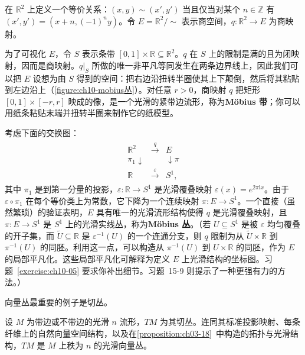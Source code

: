 \documentclass[../../main.tex]{subfiles}
\begin{document}
\begin{example}[Möbius 丛]\label{example:ch10-mobius丛}
在 $\mathbb{R}^2$ 上定义一个等价关系：$(x,y)\sim(x',y')$ 当且仅当对某个 $n\in\mathbb{Z}$ 有 $(x',y')=(x+n,(-1)^n y)$。令 $E=\mathbb{R}^2/\sim$ 表示商空间，$q\colon\mathbb{R}^2\to E$ 为商映射。

为了可视化 $E$，令 $S$ 表示条带 $[0,1]\times\mathbb{R}\subseteq\mathbb{R}^2$。$q$ 在 $S$ 上的限制是满的且为闭映射，因而是商映射。$q|_S$ 所做的唯一非平凡等同发生在两条边界线上，因此我们可以把 $E$ 设想为由 $S$ 得到的空间：把右边沿扭转半圈使其上下颠倒，然后将其粘贴到左边沿上（\cref{figure:ch10-mobius丛}）。对任意 $r>0$，商映射 $q$ 把矩形 $[0,1]\times[-r,r]$ 映成的像，是一个光滑的紧带边流形，称为\textbf{Möbius 带}；你可以用纸条粘贴末端并扭转半圈来制作它的纸模型。

考虑下面的交换图：
\begin{align*}
\begin{array}{ccc}
\mathbb{R}^2 & \xrightarrow{q} & E\\
\pi_1\downarrow && \downarrow\pi\\
\mathbb{R} & \xrightarrow{\varepsilon} & S^1,
\end{array}
\end{align*}
其中 $\pi_1$ 是到第一分量的投影，$\varepsilon\colon\mathbb{R}\to S^1$ 是光滑覆叠映射 $\varepsilon(x)=e^{2\pi\mathrm{i}x}$。由于 $\varepsilon\circ\pi_1$ 在每个等价类上为常数，它下降为一个连续映射 $\pi\colon E\to S^1$。一个直接（虽然繁琐）的验证表明，$E$ 具有唯一的光滑流形结构使得 $q$ 是光滑覆叠映射，且 $\pi\colon E\to S^1$ 是 $S^1$ 上的光滑实线丛，称为\textbf{Möbius 丛}。（若 $U\subseteq S^1$ 是被 $\varepsilon$ 均匀覆叠的开子集，而 $\widetilde U\subseteq\mathbb{R}$ 是 $\varepsilon^{-1}(U)$ 的一个连通分支，则 $q$ 限制为从 $\widetilde U\times\mathbb{R}$ 到 $\pi^{-1}(U)$ 的同胚。利用这一点，可以构造从 $\pi^{-1}(U)$ 到 $U\times\mathbb{R}$ 的同胚，作为 $E$ 的局部平凡化。这些局部平凡化可解释为定义 $E$ 上光滑结构的坐标图。习题~\ref{exercise:ch10-05} 要求你补出细节。习题~15-9 则提示了一种更强有力的方法。）
\end{example}

向量丛最重要的例子是切丛。

\begin{proposition}[切丛作为向量丛]\label{proposition:ch10-切丛作为向量丛}
设 $M$ 为带边或不带边的光滑 $n$ 流形，$TM$ 为其切丛。连同其标准投影映射、每条纤维上的自然向量空间结构，以及在\cref{proposition:ch03-18}~中构造的拓扑与光滑结构，$TM$ 是 $M$ 上秩为 $n$ 的光滑向量丛。
\end{proposition}
\end{document}
